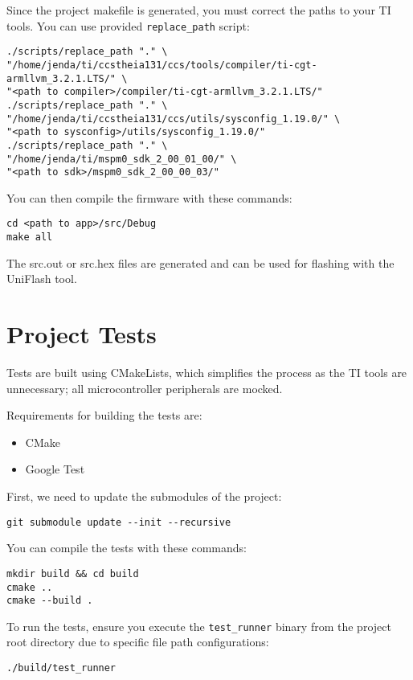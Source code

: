 Since the project makefile is generated, you must correct the paths to your TI tools. You can use provided \texttt{replace\_path} script:
\begin{verbatim}
./scripts/replace_path "." \
"/home/jenda/ti/ccstheia131/ccs/tools/compiler/ti-cgt-armllvm_3.2.1.LTS/" \
"<path to compiler>/compiler/ti-cgt-armllvm_3.2.1.LTS/"
./scripts/replace_path "." \
"/home/jenda/ti/ccstheia131/ccs/utils/sysconfig_1.19.0/" \
"<path to sysconfig>/utils/sysconfig_1.19.0/"
./scripts/replace_path "." \
"/home/jenda/ti/mspm0_sdk_2_00_01_00/" \
"<path to sdk>/mspm0_sdk_2_00_00_03/"
\end{verbatim}

You can then compile the firmware with these commands:
\begin{verbatim}
cd <path to app>/src/Debug
make all
\end{verbatim}

The src.out or src.hex files are generated and can be used for flashing with the UniFlash tool.

\section{Project Tests}
Tests are built using CMakeLists, which simplifies the process as the TI tools are unnecessary; all microcontroller peripherals are mocked.

Requirements for building the tests are:
\begin{itemize}
    \item CMake \cite{cmake}
    \item Google Test \cite{google-test}
\end{itemize}

First, we need to update the submodules of the project:
\begin{verbatim}
git submodule update --init --recursive
\end{verbatim}

You can compile the tests with these commands:
\begin{verbatim}
mkdir build && cd build
cmake ..
cmake --build .
\end{verbatim}

To run the tests, ensure you execute the \texttt{test\_runner} binary from the project root directory due to specific file path configurations:
\begin{verbatim}
./build/test_runner
\end{verbatim}

